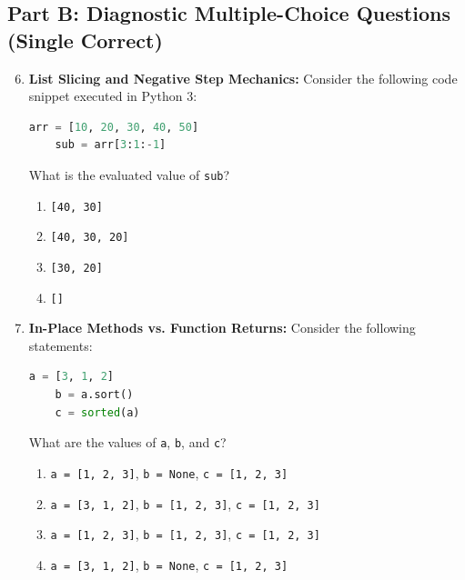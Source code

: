 \subsection*{Part B: Diagnostic Multiple-Choice Questions (Single Correct)}

\begin{enumerate}
    \setcounter{enumi}{5}
    \item \textbf{List Slicing and Negative Step Mechanics:}
    Consider the following code snippet executed in Python 3:
    \begin{lstlisting}[language=Python]
    arr = [10, 20, 30, 40, 50]
    sub = arr[3:1:-1]
    \end{lstlisting}
    What is the evaluated value of \texttt{sub}?
    \begin{enumerate}
        \item \texttt{[40, 30]}
        \item \texttt{[40, 30, 20]}
        \item \texttt{[30, 20]}
        \item \texttt{[]}
    \end{enumerate}

    \item \textbf{In-Place Methods vs. Function Returns:}
    Consider the following statements:
    \begin{lstlisting}[language=Python]
    a = [3, 1, 2]
    b = a.sort()
    c = sorted(a)
    \end{lstlisting}
    What are the values of \texttt{a}, \texttt{b}, and \texttt{c}?
    \begin{enumerate}
        \item \texttt{a = [1, 2, 3]}, \quad \texttt{b = None}, \quad \texttt{c = [1, 2, 3]}
        \item \texttt{a = [3, 1, 2]}, \quad \texttt{b = [1, 2, 3]}, \quad \texttt{c = [1, 2, 3]}
        \item \texttt{a = [1, 2, 3]}, \quad \texttt{b = [1, 2, 3]}, \quad \texttt{c = [1, 2, 3]}
        \item \texttt{a = [3, 1, 2]}, \quad \texttt{b = None}, \quad \texttt{c = [1, 2, 3]}
    \end{enumerate}
\end{enumerate}
